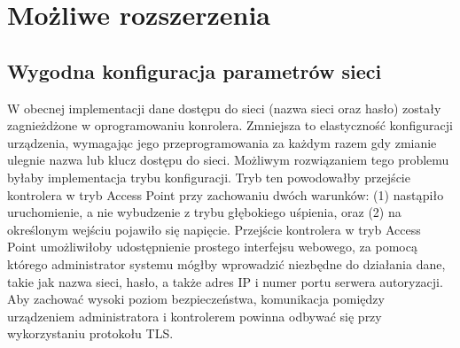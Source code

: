     \section{Możliwe rozszerzenia}

        \subsection{Wygodna konfiguracja parametrów sieci}
            W obecnej implementacji dane dostępu do sieci (nazwa sieci oraz hasło) zostały zagnieżdżone w oprogramowaniu konrolera. Zmniejsza to elastyczność konfiguracji urządzenia, wymagając jego przeprogramowania za każdym razem gdy zmianie ulegnie nazwa lub klucz dostępu do sieci. Możliwym rozwiązaniem tego problemu byłaby implementacja trybu konfiguracji. Tryb ten powodowałby przejście kontrolera w tryb Access Point przy zachowaniu dwóch warunków: (1) nastąpiło uruchomienie, a nie wybudzenie z trybu głębokiego uśpienia, oraz (2) na określonym wejściu pojawiło się napięcie. Przejście kontrolera w tryb Access Point umożliwiłoby udostępnienie prostego interfejsu webowego, za pomocą którego administrator systemu mógłby wprowadzić niezbędne do działania dane, takie jak nazwa sieci, hasło, a także adres IP i numer portu serwera autoryzacji. Aby zachować wysoki poziom bezpieczeństwa, komunikacja pomiędzy urządzeniem administratora i kontrolerem powinna odbywać się przy wykorzystaniu protokołu TLS.